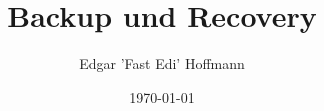 %
%
%




\title[FreieSoftwareOG.org - Backup und Recovery]{Backup und Recovery} %

\author{Edgar 'Fast Edi' Hoffmann}    %
\date{\today}         %




\begin{frame}     %
  \titlepage      %
\end{frame}


